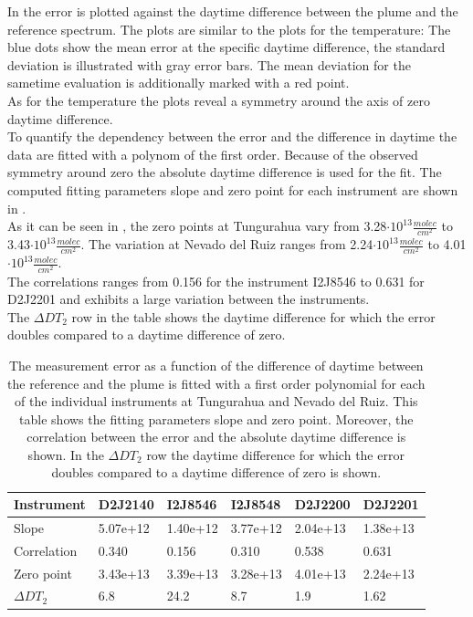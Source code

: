In  the  error is plotted against the daytime difference between the plume and the reference spectrum. The plots are similar to the plots for the temperature: The blue dots show the mean  error at the specific daytime difference, the standard deviation is illustrated with gray error bars. The mean  deviation for the sametime evaluation is additionally marked with a red point. \\
As for the temperature the plots reveal a symmetry around the axis of zero daytime difference.\\
%
To quantify the dependency between the  error and the difference in daytime the data are fitted with a polynom of the first order. Because of the observed symmetry around zero the absolute daytime difference is used for the fit. The computed fitting parameters slope and zero point for each instrument are shown in . \\
%
As it can be seen in , the zero points at Tungurahua vary from 3.28$\cdot10^{13}\frac{molec}{cm^2}$ to 3.43$\cdot10^{13}\frac{molec}{cm^2}$. The variation at Nevado del Ruiz ranges from  2.24$\cdot10^{13}\frac{molec}{cm^2}$ to 4.01$\cdot10^{13}\frac{molec}{cm^2}$. \\
The correlations ranges from 0.156 for the instrument I2J8546 to  0.631 for D2J2201 and exhibits a large variation between the instruments.\\
The $\Delta DT_{2}$ row in the table shows the daytime difference for which the error doubles compared to a daytime difference of zero.
	\begin{table}[h]
	\centering
	\begin{tabular}{|p{2cm}|p{2.15cm}|p{2.15cm}|p{2.15cm}|p{2.15cm}|p{2.15cm}|}
		Instrument	&D2J2140&I2J8546& I2J8548&D2J2200&D2J2201\\
		\toprule
		Slope&5.07e+12&1.40e+12 &3.77e+12 &2.04e+13& 1.38e+13\\
		\midrule
		Correlation&
		0.340&
		0.156&
		0.310&
		0.538&
		0.631\\
		\midrule
		Zero point& 3.43e+13&3.39e+13&3.28e+13&  4.01e+13&  2.24e+13\\
		\midrule
		$\Delta DT_{2}$&6.8&24.2&8.7&1.9&1.62\\
		\bottomrule
	\end{tabular}
	\label{tab:dtcalc}
	\caption{The  measurement error as a function of the difference of daytime between the reference and the plume is fitted with a first order polynomial for each of the individual instruments at Tungurahua and Nevado del Ruiz. This table shows the fitting parameters slope and zero point. Moreover, the correlation between the  error and the absolute daytime difference is shown. In the $\Delta DT_{2}$ row the daytime difference for which the error doubles compared to a daytime difference of zero is shown.}
\end{table}

